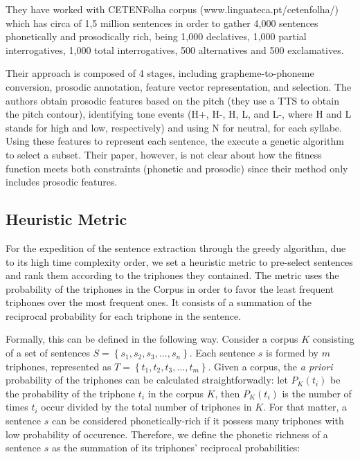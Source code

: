 They have worked with CETENFolha corpus (www.linguateca.pt/cetenfolha/) which has circa of 
1,5 million sentences in order to gather 4,000 sentences phonetically and prosodically 
rich, being 1,000 declatives, 1,000 partial interrogatives, 1,000 total interrogatives, 
500 alternatives and 500 exclamatives.   

Their approach is composed of 4 stages, including grapheme-to-phoneme conversion, 
prosodic annotation, feature vector representation, and selection. 
The authors obtain prosodic features based on the pitch (they use a TTS to obtain the pitch contour), identifying tone events (H+, H-, H, L, and L-, where H and L stands for high and low, respectively) and using N for neutral, 
for each syllabe. Using these features to represent each sentence, the execute a genetic algorithm to select a subset. Their paper, however, is not 
clear about how the fitness function meets both constraints (phonetic and prosodic) since 
their method only includes prosodic features.

\subsection{Heuristic Metric}

For the expedition of the sentence extraction through the greedy algorithm, due to its high time complexity order,
we set a heuristic metric to pre-select sentences and rank them according to the triphones they contained. The metric 
uses the probability of the triphones in  the Corpus in order to favor the least frequent triphones over the most frequent ones. 
It consists of a summation of the reciprocal probability for each triphone in the sentence.

Formally, this can be defined in the following way. Consider a corpus $K$ consisting of a set of sentences 
$S = \left \{ s_1, s_2, s_3, ..., s_n \right \}$. Each sentence $s$ is formed by $m$ triphones, represented as $T = \left \{ t_1, t_2, t_3, ..., t_m \right \}$. Given a corpus, the \emph{a priori} probability of the triphones can be calculated straightforwadly: let $P_K(t_i)$ be the probability of the triphone $t_i$ in the corpus $K$, then $P_K(t_i)$ is the number of times $t_i$ occur divided by the total number of triphones in $K$. For that matter, a sentence $s$ can be considered phonetically-rich if it possess many triphones with low probability of occurence. Therefore, we define the phonetic richness of a sentence $s$ as the summation of its triphones' reciprocal probabilities:

